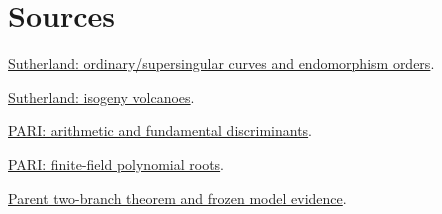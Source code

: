 \documentclass[10pt]{article}
\begin{document}
\section{Sources}
\href{https://math.mit.edu/classes/18.783/2023/LectureNotes13.pdf}{Sutherland: ordinary/supersingular curves and endomorphism orders}.\par
\href{https://math.mit.edu/classes/18.783/2023/LectureNotes22.pdf}{Sutherland: isogeny volcanoes}.\par
\href{https://pari.math.u-bordeaux.fr/dochtml/html-stable/Arithmetic_functions.html}{PARI: arithmetic and fundamental discriminants}.\par
\href{https://pari.math.u-bordeaux.fr/dochtml/html/Polynomials_and_power_series.html}{PARI: finite-field polynomial roots}.\par
\href{https://github.com/aburan28/crypto/blob/862f35365af35cdbc29a2cd9b6ab63037afb668c/research/iso1_weak_classes_20261007/two_branch_20261009/REPORT.md}{Parent two-branch theorem and frozen model evidence}.
\end{document}
